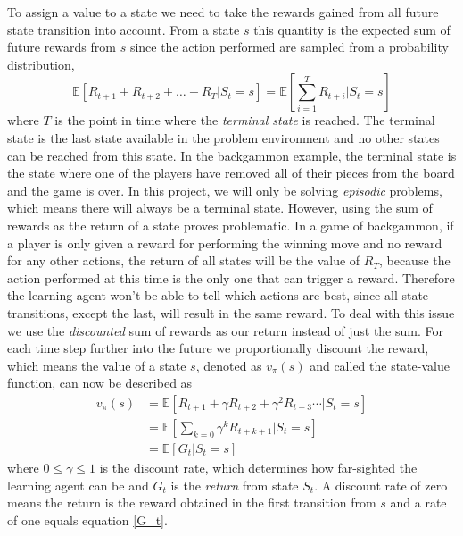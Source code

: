 \documentclass[11pt]{article}
\begin{document}
To assign a value to a state we need to take the rewards
gained from all future state transition into account.
From a state $s$ this quantity is the expected sum of
future rewards from $s$ since the action performed are
sampled from a probability distribution,
\begin{equation}\label{G_t}
    \mathds{E}[R_{t+1} + R_{t+2} + \hdots + R_{T} | S_t = s] = \mathds{E}[\sum\limits_{i = 1}^T R_{t+i} | S_t = s]
\end{equation}
where $T$ is the point in time where the \textit{terminal state} is reached.
The terminal state is the last state available in the problem environment and
no other states can be reached from this state.
In the backgammon example, the terminal state is the state where one of the players
have removed all of their pieces from the board and the game is over.
In this project, we will only be solving \textit{episodic} problems, which
means there will always be a terminal state.
However, using the sum of rewards as the return of a state proves problematic.
In a game of backgammon, if a player is only given a reward for performing the winning move
and no reward for any other actions, the return of all states will be
the value of $R_T$, because the action performed at this time is the only one
that can trigger a reward.
Therefore the learning agent won't be able to tell which actions are best,
since all state transitions, except the last, will result in the same reward.
To deal with this issue we use the \textit{discounted} sum of rewards as our return instead
of just the sum.
For each time step further into the future
we proportionally discount the reward, which means the value
of a state $s$, denoted as $v_\pi(s)$ and called the state-value function, can now be described as
\begin{equation}\label{gammaG_t}
    \begin{aligned}
        v_\pi(s) &= \mathds{E}[R_{t+1} + \gamma R_{t+2} + \gamma^2 R_{t+3} \cdots | S_t = s]\\
        &= \mathds{E}[ \sum\limits_{k = 0} \gamma^k R_{t+k+1} | S_t = s]\\
        &= \mathds{E}[ G_t | S_t = s]
    \end{aligned}
\end{equation}
where $ 0 \leq \gamma \leq 1$ is the discount rate, which determines how far-sighted the learning agent can be
and $G_t$ is the \textit{return} from state $S_t$.
A discount rate of zero means the return is the reward obtained in the first transition from $s$ and a rate of
one equals equation \ref{G_t}.
\end{document}
